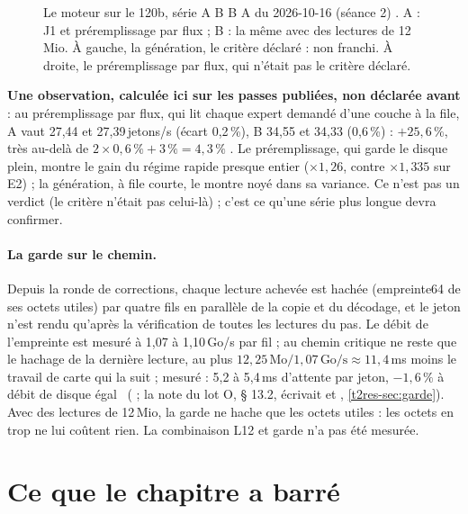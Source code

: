 \begin{figure}[ht]
\centering
\GrapheChmLdouze
\caption[Le moteur : lectures de 12\,Mio (L12)]{Le moteur sur le 120b, série A B B A du 2026-10-16 (séance 2) \mes. A : J1 et préremplissage par flux ; B : la même avec des lectures de 12\,Mio. À gauche, la génération, le critère déclaré : non franchi. À droite, le préremplissage par flux, qui n'était pas le critère déclaré.}
\label{fig:t2c-l12}
\end{figure}

\textbf{Une observation, calculée ici sur les passes publiées, non déclarée avant} : au préremplissage par flux, qui lit chaque expert demandé d'une couche à la file, A vaut 27,44 et 27,39\,jetons/s (écart 0,2\,\%), B 34,55 et 34,33 (0,6\,\%) : $+25{,}6\,\%$, très au-delà de $2 \times 0{,}6\,\% + 3\,\% = 4{,}3\,\%$ \calc. Le préremplissage, qui garde le disque plein, montre le gain du régime rapide presque entier ($\times 1{,}26$, contre $\times 1{,}335$ sur E2) ; la génération, à file courte, le montre noyé dans sa variance. Ce n'est pas un verdict (le critère n'était pas celui-là) ; c'est ce qu'une série plus longue devra confirmer.

\paragraph{La garde sur le chemin.} Depuis la ronde de corrections, chaque lecture achevée est hachée (empreinte64 de ses octets utiles) par quatre fils en parallèle de la copie et du décodage, et le jeton n'est rendu qu'après la vérification de toutes les lectures du pas. Le débit de l'empreinte est mesuré à 1,07 à 1,10\,Go/s par fil ; au chemin critique ne reste que le hachage de la dernière lecture, au plus $12{,}25\,\text{Mo} / 1{,}07\,\text{Go/s} \approx 11{,}4$\,ms moins le travail de carte qui la suit ; mesuré : 5,2 à 5,4\,ms d'attente par jeton, $-1{,}6\,\%$ à débit de disque égal \mes~( ; la note du lot O, § 13.2, écrivait  et , \cref{t2res-sec:garde}). Avec des lectures de 12\,Mio, la garde ne hache que les octets utiles : les octets en trop ne lui coûtent rien. La combinaison L12 et garde n'a pas été mesurée.

\section{Ce que le chapitre a barré}\label{sec:t2c-barres}

